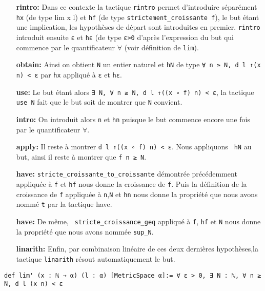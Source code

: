 \documentclass[a4paper, 12pt]{article}
\newcommand{\lean}[1]{\texttt{#1}}
\begin{document}
\begin{itemize}[align=left,itemsep=20pt]
    \item [\textbf{rintro:}] Dans ce contexte la tactique \lean{rintro} permet d'introduire séparément \lean{hx} (de type lim x l) et \lean{hf} (de type \lean{strictement_croissante f}), le but étant une implication, les hypothèses de départ sont introduites en premier. \lean{rintro} introduit ensuite \lean{ε} et \lean{hε} (de type \lean{ε>0} d'après l'expression du but qui commence par le quantificateur $\forall$ (voir définition de \lean{lim}).
    \item [\textbf{obtain:}] Ainsi on obtient \lean{N} un entier naturel et \lean{hN} de type \lean{∀ n ≥ N, d l ↑(x n) < ε} par \lean{hx} appliqué à \lean{ε} et \lean{hε}.
    \item [\textbf{use:}] Le but étant alors \lean{∃ N, ∀ n ≥ N, d l ↑((x ∘ f) n) < ε}, la tactique \lean{ use N} fait que le but soit de montrer que \lean{N} convient.
    \item [\textbf{intro:}] On introduit alors \lean{n} et \lean{hn} puisque le but commence encore une fois par le quantificateur $\forall$.
    \item [\textbf{apply:}] Il reste à montrer \lean{d l ↑((x ∘ f) n) < ε}. Nous appliquons \lean{ hN} au but, ainsi il reste à montrer que \lean{f n ≥ N}.
    \item [\textbf{have:}] \lean{stricte_croissante_to_croissante} démontrée précédemment appliquée à \lean{f} et \lean{hf} nous donne la croissance de \lean{f}. Puis la définition de la croissance de \lean{f} appliquée à \lean{n},\lean{N} et \lean{hn} nous donne la propriété que nous avons nommé \lean{t} par la tactique have.
    \item [\textbf{have:}] De même, \lean{ stricte_croissance_geq} appliqué à \lean{f}, \lean{hf} et \lean{N} nous donne la propriété que nous avons nommée \lean{sup_N}.
    \item [\textbf{linarith:}] Enfin, par combinaison linéaire de ces deux dernières hypothèses,la tactique \lean{linarith} résout automatiquement le but.
\end{itemize}

\vspace{\baselineskip}
\vspace{\baselineskip}

\begin{verbatim}
def lim' (x : ℕ → α) (l : α) [MetricSpace α]:= ∀ ε > 0, ∃ N : ℕ, ∀ n ≥ N, d l (x n) < ε
\end{verbatim}
\end{document}

